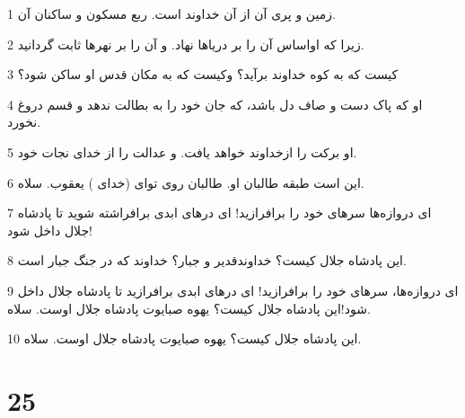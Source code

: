 \par 1 زمین و پری آن از آن خداوند است. ربع مسکون و ساکنان آن.
\par 2 زیرا که اواساس آن را بر دریاها نهاد. و آن را بر نهرها ثابت گردانید.
\par 3 کیست که به کوه خداوند برآید؟ وکیست که به مکان قدس او ساکن شود؟
\par 4 او که پاک دست و صاف دل باشد، که جان خود را به بطالت ندهد و قسم دروغ نخورد.
\par 5 او برکت را ازخداوند خواهد یافت. و عدالت را از خدای نجات خود.
\par 6 این است طبقه طالبان او. طالبان روی تو‌ای (خدای ) یعقوب. سلاه.
\par 7 ‌ای دروازه‌ها سرهای خود را برافرازید! ای درهای ابدی برافراشته شوید تا پادشاه جلال داخل شود!
\par 8 این پادشاه جلال کیست؟ خداوندقدیر و جبار؟ خداوند که در جنگ جبار است.
\par 9 ‌ای دروازه‌ها، سرهای خود را برافرازید! ای درهای ابدی برافرازید تا پادشاه جلال داخل شود!این پادشاه جلال کیست؟ یهوه صبایوت پادشاه جلال اوست. سلاه.
\par 10 این پادشاه جلال کیست؟ یهوه صبایوت پادشاه جلال اوست. سلاه.
 
\chapter{25}

